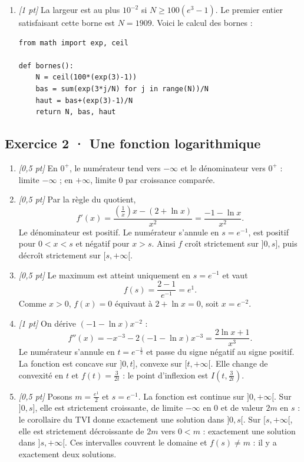 \begin{enumerate}

\item \textit{[1 pt]} La largeur est au plus $10^{-2}$ si $N\ge100(e^{3}-1)$. Le premier entier satisfaisant cette borne est $N=1909$. Voici le calcul des bornes :
\begin{lstlisting}
from math import exp, ceil

def bornes():
    N = ceil(100*(exp(3)-1))
    bas = sum(exp(3*j/N) for j in range(N))/N
    haut = bas+(exp(3)-1)/N
    return N, bas, haut
\end{lstlisting}


\end{enumerate}

\subsection*{Exercice 2 · Une fonction logarithmique}\begin{enumerate}

\item \textit{[0,5 pt]} En $0^+$, le numérateur tend vers $-\infty$ et le dénominateur vers $0^+$ : limite $-\infty$ ; en $+\infty$, limite $0$ par croissance comparée.

\item \textit{[0,5 pt]} Par la règle du quotient,
\[f'(x)=\frac{(\frac{1}{x})x-(2+\ln x)}{x^2}=\frac{-1-\ln x}{x^2}.\]
Le dénominateur est positif. Le numérateur s'annule en $s=e^{-1}$, est positif pour $0<x<s$ et négatif pour $x>s$. Ainsi $f$ croît strictement sur $]0,s]$, puis décroît strictement sur $[s,+\infty[$.

\item \textit{[0,5 pt]} Le maximum est atteint uniquement en $s=e^{-1}$ et vaut
\[f(s)=\frac{2- 1}{e^{-1}}=e^{1}.\]
Comme $x>0$, $f(x)=0$ équivaut à $2+\ln x=0$, soit $x=e^{-2}$.

\item \textit{[1 pt]} On dérive $(-1-\ln x)x^{-2}$ :
\[f''(x)=-x^{-3}-2(-1-\ln x)x^{-3}=\frac{2\ln x+1}{x^3}.\]
Le numérateur s'annule en $t=e^{-\frac{1}{2}}$ et passe du signe négatif au signe positif. La fonction est concave sur $]0,t]$, convexe sur $[t,+\infty[$. Elle change de convexité en $t$ et $f(t)=\frac{3}{2t}$ : le point d'inflexion est $I(t,\frac{3}{2t})$.

\item \textit{[0,5 pt]} Posons $m=\frac{e^{1}}{2}$ et $s=e^{-1}$. La fonction est continue sur $]0,+\infty[$. Sur $]0,s]$, elle est strictement croissante, de limite $-\infty$ en $0$ et de valeur $2m$ en $s$ : le corollaire du TVI donne exactement une solution dans $]0,s[$. Sur $[s,+\infty[$, elle est strictement décroissante de $2m$ vers $0<m$ : exactement une solution dans $]s,+\infty[$. Ces intervalles couvrent le domaine et $f(s)\ne m$ : il y a exactement deux solutions.


\end{enumerate}

